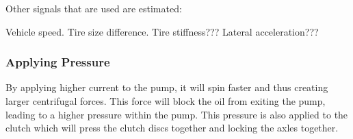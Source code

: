 Other signals that are used are estimated:

Vehicle speed.
Tire size difference.
Tire stiffness???
Lateral acceleration???



\subsubsection{Applying Pressure}

By applying higher current to the pump, it will spin faster and thus creating larger centrifugal forces. This force will block the oil from exiting the pump, leading to a higher pressure within the pump. This pressure is also applied to the clutch which will press the clutch discs together and locking the axles together. 

